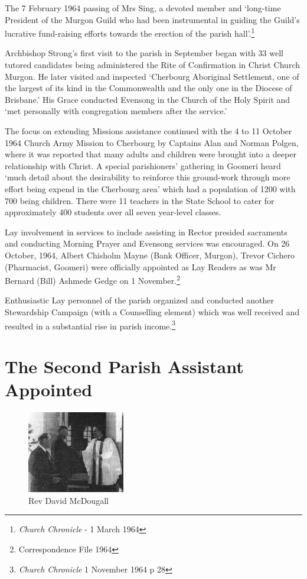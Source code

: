 The 7 February 1964 passing of Mrs Sing, a devoted member and `long-time
President of the Murgon Guild who had been instrumental in guiding the
Guild's lucrative fund-raising efforts towards the erection of the
parish hall'.\footnote{\emph{Church Chronicle} - 1 March 1964}

Archbishop Strong's first visit to the parish in September began with 33
well tutored candidates being administered the Rite of Confirmation in
Christ Church Murgon. He later visited and inspected `Cherbourg
Aboriginal Settlement, one of the largest of its kind in the
Commonwealth and the only one in the Diocese of Brisbane.' His Grace
conducted Evensong in the Church of the Holy Spirit and `met personally
with congregation members after the service.'

The focus on extending Missions assistance continued with the 4 to 11
October 1964 Church Army Mission to Cherbourg by Captains Alan and
Norman Polgen, where it was reported that many adults and children were
brought into a deeper relationship with Christ. A special parishioners'
gathering in Goomeri heard `much detail about the desirability to
reinforce this ground-work through more effort being expend in the
Cherbourg area' which had a population of 1200 with 700 being children.
There were 11 teachers in the State School to cater for approximately
400 students over all seven year-level classes.

Lay involvement in services to include assisting in Rector presided
sacraments and conducting Morning Prayer and Evensong services was
encouraged. On 26 October, 1964, Albert Chisholm Mayne (Bank Officer,
Murgon), Trevor Cichero (Pharmacist, Goomeri) were officially appointed
as Lay Readers as was Mr Bernard (Bill) Ashmede Gedge on 1
November.\footnote{Correspondence File 1964}

Enthusiastic Lay personnel of the parish organized and conducted another
Stewardship Campaign (with a Counselling element) which was well
received and resulted in a substantial rise in parish income.\footnote{\emph{Church
  Chronicle} 1 November 1964 p 28}

\section{The Second Parish Assistant
Appointed}




\begin{figure}
\begin{center}
\includegraphics[width=0.38\textwidth,right]{images/DMcDougall.jpg}
\caption{Rev David McDougall}
\end{center}
\end{figure}


